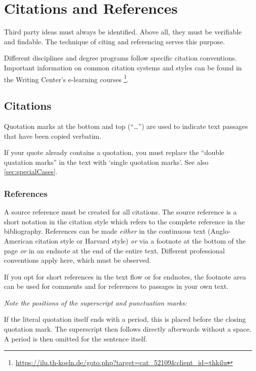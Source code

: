\chapter{Citations and References}
\label{chap:literature}
Third party ideas must always be identified. Above all, they must be verifiable 
and findable. The technique of citing and referencing serves this purpose.

Different disciplines and degree programs follow specific citation conventions. 
Important information on common citation systems and styles can be found in the 
Writing Center's e-learning courses%
\footnote{\href{https://ilu.th-koeln.de/goto.php?target=cat_52109&client_id=thkilu}{https://ilu.th-koeln.de/goto.php?target=cat\_52109\&client\_id=thkilu}}.

\section{Citations}
Quotation marks at the bottom and top (\enquote{\ldots}) are used to indicate 
text passages that have been copied verbatim.

If your quote already contains a quotation, you must replace the \enquote{double 
quatation marks} in the text with \enquote*{single quotation marks}. See 
also \cref{sec:specialCases}.

\subsection{References}
A source reference must be created for all citations. The source reference is a 
short notation in the citation style which refers to the complete reference in 
the bibliography. References can be made \emph{either} in the continuous text 
(Anglo-American citation style or Harvard style) \emph{or} via a footnote at the 
bottom of the page \emph{or} in an endnote at the end of the entire text. 
Different professional conventions apply here, which must be observed.

If you opt for short references in the text flow or for endnotes, the footnote 
area can be used for comments and for references to passages in your own text.

\emph{Note the positions of the superscript and punctuation marks:}

If the literal quotation itself ends with a period, this is placed before the 
closing quotation mark. The superscript then follows directly afterwards without 
a space. A period is then omitted for the sentence itself. 

